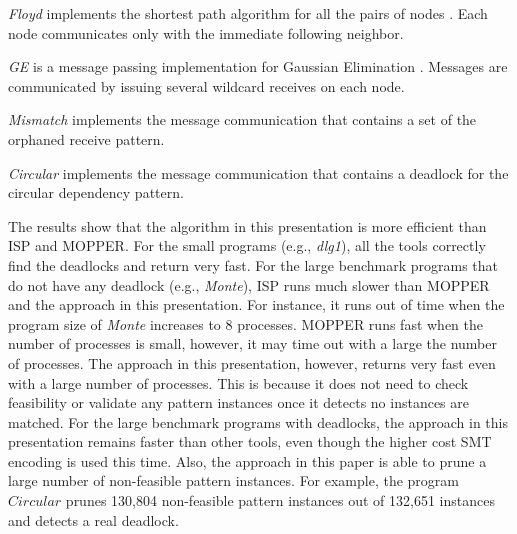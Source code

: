 
\textit{Floyd} implements the shortest path algorithm for all the pairs of nodes \cite{DBLP:conf/ppopp/XueLWGCZZV09}. Each node communicates only with the immediate following neighbor.

\textit{GE} is a message passing implementation for Gaussian Elimination  \cite{DBLP:conf/ppopp/XueLWGCZZV09}. Messages are communicated by issuing several wildcard receives on each node. 

\textit{Mismatch} implements the message communication that contains a set of the orphaned receive pattern. 

\textit{Circular} implements the message communication that contains a deadlock for the circular dependency pattern.


The results show that the algorithm in this presentation is more efficient than ISP and MOPPER. For the small programs (e.g., \textit{dlg1}), all the tools correctly find the deadlocks and return very fast. For the large benchmark programs that do not have any deadlock (e.g., \textit{Monte}), ISP runs much slower than MOPPER and the approach in this presentation. For instance, it runs out of time when the program size of \textit{Monte} increases to 8 processes. MOPPER runs fast when the number of processes is small, however, it may time out with a large the number of processes. The approach in this presentation, however, returns very fast even with a large number of processes. This is because it  does not need to check feasibility or validate any pattern instances once it detects no instances are matched. 
For the large benchmark programs with deadlocks, the approach in this presentation remains faster than other tools, even though the higher cost SMT encoding is used this time. 
Also, the approach in this paper is able to prune a large number of non-feasible pattern instances. For example, the program $\mathit{Circular}$ prunes 130,804 non-feasible pattern instances out of 132,651 instances and detects a real deadlock. 

